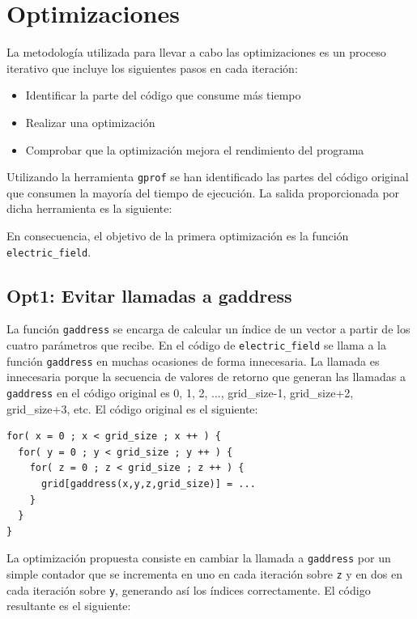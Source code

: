 \section{Optimizaciones}

La metodolog\'{i}a utilizada para llevar a cabo las optimizaciones es un
proceso iterativo que incluye los siguientes pasos en cada iteraci\'{o}n:

\begin{itemize}
\item Identificar la parte del c\'{o}digo que consume m\'{a}s tiempo
\item Realizar una optimizaci\'{o}n
\item Comprobar que la optimizaci\'{o}n mejora el rendimiento del programa
\end{itemize}

Utilizando la herramienta \texttt{gprof} se han identificado las partes del
c\'{o}digo original que consumen la mayor\'{i}a del tiempo de ejecuci\'{o}n.
La salida proporcionada por dicha herramienta es la siguiente:


En consecuencia, el objetivo de la primera optimizaci\'{o}n es la funci\'{o}n
\texttt{electric\_field}.

\subsection{Opt1: Evitar llamadas a gaddress}

La funci\'{o}n \texttt{gaddress} se encarga de calcular un \'{i}ndice de un
vector a partir de los cuatro par\'{a}metros que recibe. En el c\'{o}digo de
\texttt{electric\_field} se llama a la funci\'{o}n \texttt{gaddress} en
muchas ocasiones de forma innecesaria. La llamada es innecesaria porque la
secuencia de valores de retorno que generan las llamadas a \texttt{gaddress}
en el c\'{o}digo original es 0, 1, 2, ..., grid\_size-1, grid\_size+2,
grid\_size+3, etc. El c\'{o}digo original es el siguiente:

\begin{lstlisting}[]
for( x = 0 ; x < grid_size ; x ++ ) {
  for( y = 0 ; y < grid_size ; y ++ ) {
    for( z = 0 ; z < grid_size ; z ++ ) {
      grid[gaddress(x,y,z,grid_size)] = ...
    }
  }
}
\end{lstlisting}

La optimizaci\'{o}n propuesta consiste en cambiar la llamada a
\texttt{gaddress} por un simple contador que se incrementa en uno en cada
iteraci\'{o}n sobre \texttt{z} y en dos en cada iteraci\'{o}n sobre
\texttt{y}, generando as\'{i} los \'{i}ndices correctamente. El c\'{o}digo
resultante es el siguiente:


